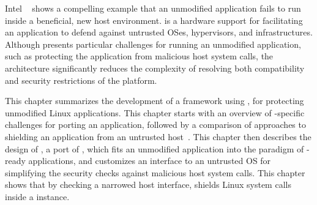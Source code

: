 Intel \sgx{}~\cite{intelsgx} shows a compelling example that an unmodified application fails to run inside a beneficial, new host environment.
\sgx{} is a hardware support
for facilitating an application to defend against untrusted OSes, hypervisors, and infrastructures.
Although \sgx{} presents particular challenges for running an unmodified application, such as protecting the application
from malicious host system calls,
the \graphene{} architecture significantly reduces the complexity
of resolving both compatibility and security restrictions of the \sgx{} platform.


This chapter summarizes the development of a \sgx{} framework using \graphene{}, for protecting unmodified Linux applications.
This chapter starts with an overview of \sgx{}-specific challenges
for porting an application,
followed by a comparison of approaches to shielding an application from an untrusted host~\cite{osdi16scone,shinde17panoply,baumann14haven}.
This chapter then describes the design of \graphenesgx{},
a \sgx{} port of \graphene{},
which fits an unmodified application into the paradigm of \sgx{}-ready applications,
and customizes an interface to an untrusted OS
for simplifying the security checks against malicious host system calls.
This chapter shows
that by checking a narrowed host interface,
\graphenesgx{} shields Linux system calls inside a \thelibos{} instance.
